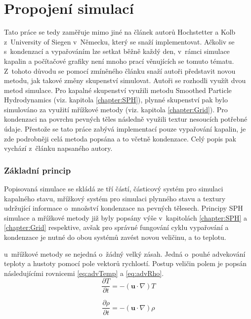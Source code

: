 \section{Propojení simulací}
\label{chapter:evap}
Tato práce se tedy zaměřuje mimo jiné na článek \cite{Evap&Cond} autorů Hochstetter a Kolb z~University of Siegen v~Německu, který se snaží implementovat. Ačkoliv se s~kondenzací a vypařováním lze setkat běžně každý den, v~rámci simulace kapalin a počítačové grafiky není mnoho prací věnujících se tomuto tématu. Z~tohoto důvodu se pomocí zmíněného článku snaží autoři představit novou metodu, jak takové změny skupenství simulovat. Autoři se rozhodli využít dvou metod simulace. Pro kapalné skupenství využili metodu Smoothed Particle Hydrodynamics (viz. kapitola \ref{chapter:SPH}), plynné skupenství pak bylo simulováno za využití mřížkové metody (viz. kapitola \ref{chapter:Grid}). Pro kondenzaci na povrchu pevných těles následně využili textur nesoucích potřebné údaje. Přestože se tato práce zabývá implementací pouze vypařování kapalin, je zde podrobněji celá metoda popsána a to včetně kondenzace. Celý popis pak vychází z~článku napsaného autory. \cite{Evap&Cond}

\subsubsection{Základní princip}
Popisovaná simulace se skládá ze tří částí, částicový systém pro simulaci kapalného stavu, mřížkový systém pro simulaci plynného stavu a textury udržující informace o~množství kondenzace na pevných tělesech. Principy SPH simulace a mřížkové metody již byly popsány výše v~kapitolách \ref{chapter:SPH} a \ref{chapter:Grid} respektive, avšak pro správné fungování cyklu vypařování a kondenzace je nutné do obou systémů zavést novou veličinu, a to teplotu.

u~mřížkové metody se nejedná o~žádný velký zásah. Jedná o~pouhé advekování teploty a hustoty pomocí pole vektorů rychlostí. Postup veličin polem je popsán následujícími rovnicemi \ref{eq:advTemp} a \ref{eq:advRho}.
\begin{equation}
	\frac{\partial T}{\partial t} = -(\mathbf{u} \cdot \nabla)T
	\label{eq:advTemp}
\end{equation}

\begin{equation}
	\frac{\partial \rho}{\partial t} = -(\mathbf{u} \cdot \nabla)\rho
	\label{eq:advRho}
\end{equation}

